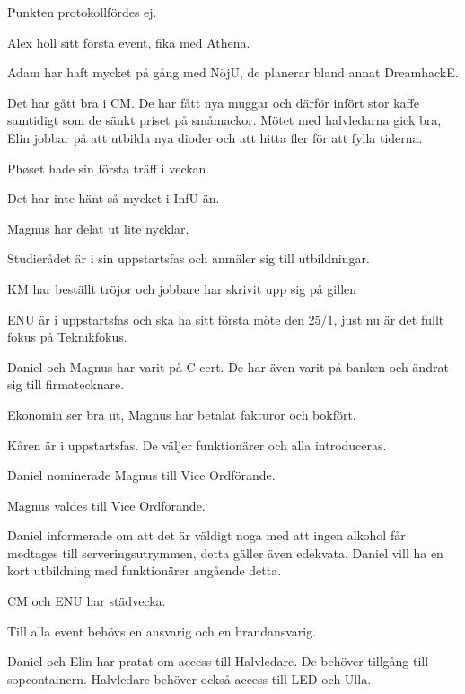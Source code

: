 \documentclass[10pt]{article}
\begin{document}
\begin{paragrafer}
\begin{paragrafer}
Punkten protokollfördes ej.

Alex höll sitt första event, fika med Athena.

Adam har haft mycket på gång med NöjU, de planerar bland annat DreamhackE.

Det har gått bra i CM. De har fått nya muggar och därför infört stor kaffe samtidigt som de sänkt priset på småmackor. Mötet med halvledarna gick bra, Elin jobbar på att utbilda nya dioder och att hitta fler för att fylla tiderna.

Phøset hade sin första träff i veckan.

Det har inte hänt så mycket i InfU än.

Magnus har delat ut lite nycklar.

Studierådet är i sin uppstartsfas och anmäler sig till utbildningar.

KM har beställt tröjor och jobbare har skrivit upp sig på gillen

ENU är i uppstartsfas och ska ha sitt första möte den 25/1, just nu är det fullt fokus på Teknikfokus.

Daniel och Magnus har varit på C-cert. De har även varit på banken och ändrat sig till firmatecknare.


Ekonomin ser bra ut, Magnus har betalat fakturor och bokfört.


Kåren är i uppstartsfas. De väljer funktionärer och alla introduceras.

\end{paragrafer}

Daniel nominerade Magnus till Vice Ordförande.

Magnus valdes till Vice Ordförande.

Daniel informerade om att det är väldigt noga med att ingen alkohol får medtages till serveringsutrymmen, detta gäller även edekvata.
Daniel vill ha en kort utbildning med funktionärer angående detta.

CM och ENU har städvecka.

Till alla event behövs en ansvarig och en brandansvarig.

Daniel och Elin har pratat om access till Halvledare. De behöver tillgång till sopcontainern.
Halvledare behöver också access till LED och Ulla.


\end{paragrafer}
\end{document}

